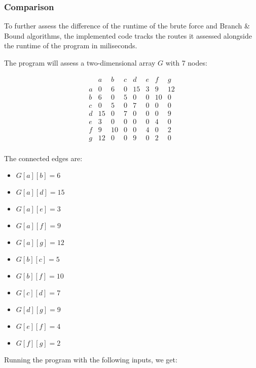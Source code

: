 \subsubsection{Comparison}

To further assess the difference of the runtime of the brute force and Branch \& Bound algorithms, the implemented code tracks the routes it assessed alongside the runtime of the program in miliseconds.

The program will assess a two-dimensional array $G$ with 7 nodes:

\[
\begin{array}{c|ccccccc}
    & a & b & c & d & e & f & g \\
\hline
a & 0 & 6  & 0  & 15 & 3  & 9  & 12  \\
b & 6  & 0  & 5  & 0  & 0  & 10 & 0  \\
c & 0  & 5  & 0  & 7  & 0  & 0  & 0  \\
d & 15 & 0  & 7 & 0  & 0  & 0  & 9  \\
e & 3  & 0  & 0  & 0  & 0  & 4  & 0  \\
f & 9  & 10 & 0  & 0  & 4  & 0  & 2  \\
g & 12  & 0  & 0  & 9  & 0  & 2  & 0 \\
\end{array}
\]

The connected edges are:
\begin{itemize}
    \item $G[a][b] = 6$
    \item $G[a][d] = 15$
    \item $G[a][e] = 3$
    \item $G[a][f] = 9$
    \item $G[a][g] = 12$
    \item $G[b][c] = 5$
    \item $G[b][f] = 10$
    \item $G[c][d] = 7$
    \item $G[d][g] = 9$
    \item $G[e][f] = 4$
    \item $G[f][g] = 2$
\end{itemize}

Running the program with the following inputs, we get:

